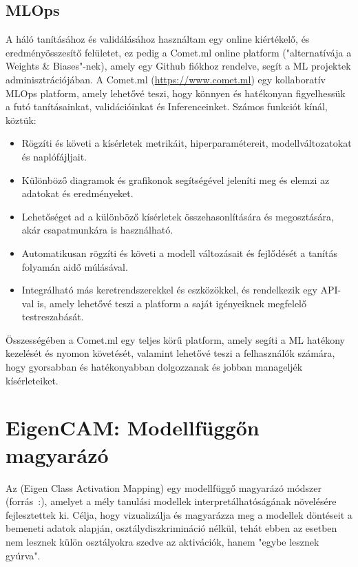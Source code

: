 \documentclass[12pt,oneside,a4paper]{article}
\newcommand{\newsection}[1]{\clearpage\section{#1}}\label{makro}
\theoremstyle{remark}
\newtheorem*{observation}{ \newline \textit}
\begin{document}
\subsection{MLOps}\label{subsec:mlops}
A háló tanításához és validálásához használtam egy online kiértékelő, és eredményösszesítő felületet, ez pedig a Comet.ml online platform ("alternatívája a Weights \& Biases"-nek), amely egy Github fiókhoz rendelve, segít a \ac{ML} projektek adminisztrációjában.
A Comet.ml (\url{https://www.comet.ml}) egy kollaboratív \ac{MLOps} platform, amely lehetővé teszi, hogy könnyen és
    hatékonyan figyelhessük a futó tanításainkat, validációinkat és \gls{Inference}inket.
    Számos funkciót kínál, köztük:
    \begin{itemize}
        \item Rögzíti és követi a kísérletek metrikáit, hiperparamétereit, modellváltozatokat és naplófájljait.
        \item Különböző diagramok és grafikonok segítségével jeleníti meg és elemzi az adatokat és eredményeket.
        \item Lehetőséget ad a különböző kísérletek összehasonlítására és megosztására, akár csapatmunkára is használható.
        \item  Automatikusan rögzíti és követi a modell változásait és fejlődését a tanítás folyamán aidő múlásával.
        \item Integrálható más keretrendszerekkel és eszközökkel, és rendelkezik egy API-val is, amely lehetővé teszi a platform
            a saját igényeiknek megfelelő testreszabását.
    \end{itemize}
    \begin{observation}
        Összességében a Comet.ml egy teljes körű platform, amely segíti a \ac{ML} hatékony kezelését
        és nyomon követését, valamint lehetővé teszi a felhasználók számára, hogy gyorsabban és hatékonyabban dolgozzanak és jobban manageljék
        kísérleteiket.
    \end{observation}

\newsection{EigenCAM: Modellfüggőn magyarázó}\label{sec:eigencam:-modellfuggo-magyarazo}
     Az  (Eigen Class Activation Mapping) egy modellfüggő magyarázó módszer (forrás~\cite{pytorch-grad-cam}:), amelyet a mély tanulási
     modellek interpretálhatóságának növelésére fejlesztettek ki.
     Célja, hogy vizualizálja és magyarázza meg a modellek döntéseit a bemeneti adatok alapján,
     osztálydiszkrimináció nélkül, tehát ebben az esetben nem lesznek külön osztályokra szedve az aktivációk, hanem "egybe lesznek gyúrva".
\end{document}
